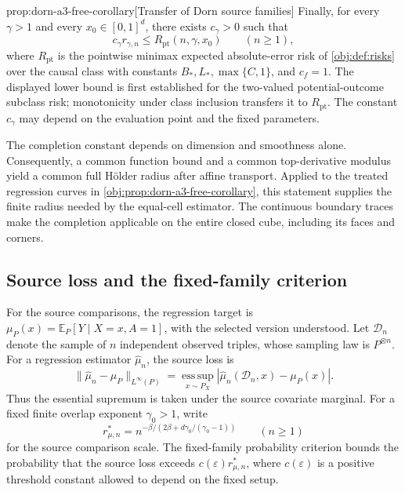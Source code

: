 \documentclass[11pt]{article}
\begin{document}
\begin{propositionv}{prop:dorn-a3-free-corollary}[Transfer of Dorn source families]
Finally, for every \(\gamma>1\) and every \(x_0\in[0,1]^d\), there exists \(c_\gamma>0\) such that
\[
c_\gamma r_{\gamma,n}
\le R_{\mathrm{pt}}(n,\gamma,x_0)
\qquad(n\ge1),
\]
where \(R_{\mathrm{pt}}\) is the pointwise minimax expected absolute-error risk of \cref{obj:def:risks} over the causal class with constants \(B_*,L_*,\max\{C,1\}\), and \(c_f=1\). The displayed lower bound is first established for the two-valued potential-outcome subclass risk; monotonicity under class inclusion transfers it to \(R_{\mathrm{pt}}\). The constant \(c_\gamma\) may depend on the evaluation point and the fixed parameters.
\end{propositionv}

The completion constant depends on dimension and smoothness alone. Consequently, a common function bound and a common top-derivative modulus yield a common full Hölder radius after affine transport. Applied to the treated regression curves in \cref{obj:prop:dorn-a3-free-corollary}, this statement supplies the finite radius needed by the equal-cell estimator. The continuous boundary traces make the completion applicable on the entire closed cube, including its faces and corners.

\subsection{Source loss and the fixed-family criterion}

For the source comparisons, the regression target is \(\mu_P(x)=\mathbb E_P[Y\mid X=x,A=1]\), with the selected version understood. Let \(\mathcal D_n\) denote the sample of \(n\) independent observed triples, whose sampling law is \(P^{\otimes n}\). For a regression estimator \(\widehat\mu_n\), the source loss is
\[
\|\widehat\mu_n-\mu_P\|_{L^\infty(P)}
=
\operatorname*{ess\,sup}_{x\sim P_X}
|\widehat\mu_n(\mathcal D_n,x)-\mu_P(x)|.
\]
Thus the essential supremum is taken under the source covariate marginal. For a fixed finite overlap exponent \(\gamma_0>1\), write
\[
r^*_{\mu,n}
=
n^{-\beta/(2\beta+d\gamma_0/(\gamma_0-1))}
\qquad(n\ge1)
\]
for the source comparison scale. The fixed-family probability criterion bounds the probability that the source loss exceeds \(c(\varepsilon)r^*_{\mu,n}\), where \(c(\varepsilon)\) is a positive threshold constant allowed to depend on the fixed setup.
\end{document}
